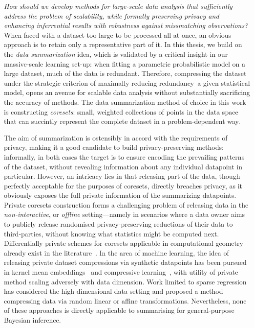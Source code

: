 \emph{How should we develop methods for large-scale data analysis that sufficiently address the problem of scalability, while formally preserving privacy and enhancing inferrential results with robustness against missmatching observations?} When faced with a dataset too large to be processed all at once, an obvious approach is to retain only a representative part of it. In this thesis, we build on the \emph{data summarization} idea, which is validated by a critical insight in our massive-scale learning set-up: when fitting a parametric probabilistic model on a large dataset, much of the data is redundant. Therefore, compressing the dataset under the strategic criterion of maximally reducing redundancy~\wrt a given statistical model, opens an avenue for scalable data analysis without substantially sacrificing the accuracy of methods. The data summarization method of choice in this work is constructing \emph{coresets}: small, weighted collections of points in the data space that can succintly represent the complete dataset in a problem-dependent way. 

The aim of summarization is ostensibly in accord with the requirements of privacy, making it a good candidate to build privacy-preserving methods: informally, in both cases the target is to ensure encoding the prevailing patterns of the dataset, without revealing information about any individual datapoint in particular. However, an intricacy lies in that releasing part of the data, though perfectly acceptable for the purposes of coresets, directly breaches privacy, as it obviously exposes the full private information of the summarizing datapoints. Private coresets construction forms a challenging problem of releasing data in the \emph{non-interactive}, or \emph{offline} setting---namely in scenarios where a data owner aims to publicly release randomised privacy-preserving reductions of their data to third-parties, without knowing what statistics might be computed next. Differentially private schemes for coresets applicable in computational geometry already exist in the literature~\citep{feldman09,feldman17}. In the area of machine learning, the idea of releasing private dataset compressions via synthetic datapoints has been pursued in kernel mean embeddings~\citep{balog18} and compressive learning~\citep{schellekens19}, with utility of private method scaling adversely with data dimension. Work limited to sparse regression~\citep{zhou08} has considered the high-dimensional data setting and proposed a method compressing data via random linear or affine transformations. Nevertheless, none of these approaches is directly applicable to summarising for general-purpose Bayesian inference. 

